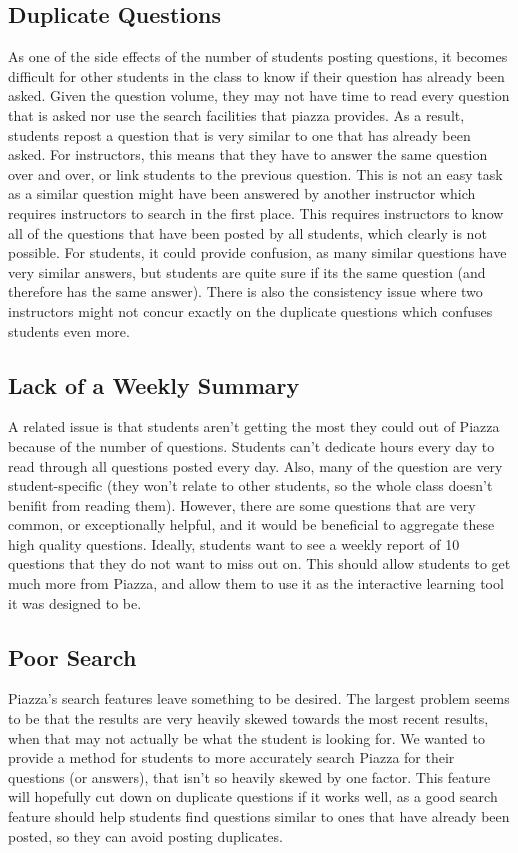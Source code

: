 \documentclass[sigconf]{acmart}
\begin{document}
\subsection{Duplicate Questions}
As one of the side effects of the number of students posting questions, it becomes difficult for other students in the class to know if their question has already been asked. Given the question volume, they may not have time to read every question that is asked nor use the search facilities that piazza provides. As a result, students repost a question that is very similar to one that has already been asked. For instructors, this means that they have to answer the same question over and over, or link students to the previous question. This is not an easy task as a similar question might have been answered by another instructor which requires instructors to search in the first place. This requires instructors to know all of the questions that have been posted by all students, which clearly is not possible. For students, it could provide confusion, as many similar questions have very similar answers, but students are quite sure if its the same question (and therefore has the same answer). There is also the consistency issue where two instructors might not concur exactly on the duplicate questions which confuses students even more.

\subsection{Lack of a Weekly Summary}
A related issue is that students aren't getting the most they could out of Piazza because of the number of questions. Students can't dedicate hours every day to read through all questions posted every day. Also, many of the question are very student-specific (they won't relate to other students, so the whole class doesn't benifit from reading them). However, there are some questions that are very common, or exceptionally helpful, and it would be beneficial to aggregate these high quality questions. Ideally, students want to see a weekly report of 10 questions that they do not want to miss out on. This should allow students to get much more from Piazza, and allow them to use it as the interactive learning tool it was designed to be.

\subsection{Poor Search}
Piazza's search features leave something to be desired. The largest problem seems to be that the results are very heavily skewed towards the most recent results, when that may not actually be what the student is looking for. We wanted to provide a method for students to more accurately search Piazza for their questions (or answers), that isn't so heavily skewed by one factor. This feature will hopefully cut down on duplicate questions if it works well, as a good search feature should help students find questions similar to ones that have already been posted, so they can avoid posting duplicates.
\end{document}
